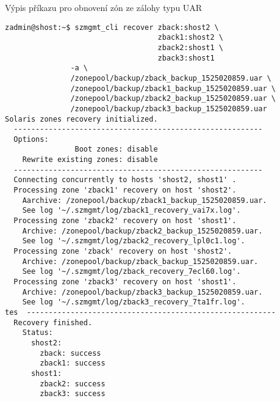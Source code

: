 \begin{listing}[ht]
  \caption{Výpis příkazu pro obnovení zón ze zálohy typu UAR}  
  \begin{verbatim}
zadmin@shost:~$ szmgmt_cli recover zback:shost2 \
                                   zback1:shost2 \
                                   zback2:shost1 \
                                   zback3:shost1 
               -a \ 
               /zonepool/backup/zback_backup_1525020859.uar \
               /zonepool/backup/zback1_backup_1525020859.uar \
               /zonepool/backup/zback2_backup_1525020859.uar \
               /zonepool/backup/zback3_backup_1525020859.uar
Solaris zones recovery initialized.
  ---------------------------------------------------------
  Options:
                Boot zones: disable
    Rewrite existing zones: disable
  ---------------------------------------------------------
  Connecting concurrently to hosts 'shost2, shost1' .
  Processing zone 'zback1' recovery on host 'shost2'.
    Aarchive: /zonepool/backup/zback1_backup_1525020859.uar.
    See log '~/.szmgmt/log/zback1_recovery_vai7x.log'.
  Processing zone 'zback2' recovery on host 'shost1'.
    Archive: /zonepool/backup/zback2_backup_1525020859.uar.
    See log '~/.szmgmt/log/zback2_recovery_lpl0c1.log'.
  Processing zone 'zback' recovery on host 'shost2'.
    Archive: /zonepool/backup/zback_backup_1525020859.uar.
    See log '~/.szmgmt/log/zback_recovery_7ecl60.log'.
  Processing zone 'zback3' recovery on host 'shost1'.
    Archive: /zonepool/backup/zback3_backup_1525020859.uar.
    See log '~/.szmgmt/log/zback3_recovery_7ta1fr.log'.
tes  ---------------------------------------------------------
  Recovery finished.
    Status:
      shost2:
        zback: success
        zback1: success
      shost1:
        zback2: success
        zback3: success
  \end{verbatim}
  \label{code:test:recovery}
\end{listing}